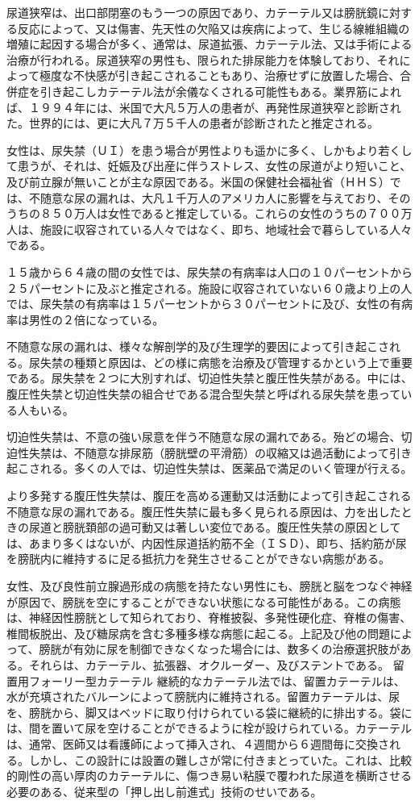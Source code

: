 尿道狭窄は、出口部閉塞のもう一つの原因であり、カテーテル又は膀胱鏡に対する反応によって、又は傷害、先天性の欠陥又は疾病によって、生じる線維組織の増殖に起因する場合が多く、通常は、尿道拡張、カテーテル法、又は手術による治療が行われる。尿道狭窄の男性も、限られた排尿能力を体験しており、それによって極度な不快感が引き起こされることもあり、治療せずに放置した場合、合併症を引き起こしカテーテル法が余儀なくされる可能性もある。業界筋によれば、１９９４年には、米国で大凡５万人の患者が、再発性尿道狭窄と診断された。世界的には、更に大凡７万５千人の患者が診断されたと推定される。

女性は、尿失禁（ＵＩ）を患う場合が男性よりも遥かに多く、しかもより若くして患うが、それは、妊娠及び出産に伴うストレス、女性の尿道がより短いこと、及び前立腺が無いことが主な原因である。米国の保健社会福祉省（ＨＨＳ）では、不随意な尿の漏れは、大凡１千万人のアメリカ人に影響を与えており、そのうちの８５０万人は女性であると推定している。これらの女性のうちの７００万人は、施設に収容されている人々ではなく、即ち、地域社会で暮らしている人々である。

１５歳から６４歳の間の女性では、尿失禁の有病率は人口の１０パーセントから２５パーセントに及ぶと推定される。施設に収容されていない６０歳より上の人では、尿失禁の有病率は１５パーセントから３０パーセントに及び、女性の有病率は男性の２倍になっている。

不随意な尿の漏れは、様々な解剖学的及び生理学的要因によって引き起こされる。尿失禁の種類と原因は、どの様に病態を治療及び管理するかという上で重要である。尿失禁を２つに大別すれば、切迫性失禁と腹圧性失禁がある。中には、腹圧性失禁と切迫性失禁の組合せである混合型失禁と呼ばれる尿失禁を患っている人もいる。

切迫性失禁は、不意の強い尿意を伴う不随意な尿の漏れである。殆どの場合、切迫性失禁は、不随意な排尿筋（膀胱壁の平滑筋）の収縮又は過活動によって引き起こされる。多くの人では、切迫性失禁は、医薬品で満足のいく管理が行える。

より多発する腹圧性失禁は、腹圧を高める運動又は活動によって引き起こされる不随意な尿の漏れである。腹圧性失禁に最も多く見られる原因は、力を出したときの尿道と膀胱頚部の過可動又は著しい変位である。腹圧性失禁の原因としては、あまり多くはないが、内因性尿道括約筋不全（ＩＳＤ）、即ち、括約筋が尿を膀胱内に維持するに足る抵抗力を発生させることができない病態がある。

女性、及び良性前立腺過形成の病態を持たない男性にも、膀胱と脳をつなぐ神経が原因で、膀胱を空にすることができない状態になる可能性がある。この病態は、神経因性膀胱として知られており、脊椎披裂、多発性硬化症、脊椎の傷害、椎間板脱出、及び糖尿病を含む多種多様な病態に起こる。上記及び他の問題によって、膀胱が有効に尿を制御できなくなった場合には、数多くの治療選択肢がある。それらは、カテーテル、拡張器、オクルーダー、及びステントである。 留置用フォーリー型カテーテル 継続的なカテーテル法では、留置カテーテルは、水が充填されたバルーンによって膀胱内に維持される。留置カテーテルは、尿を、膀胱から、脚又はベッドに取り付けられている袋に継続的に排出する。袋には、間を置いて尿を空けることができるように栓が設けられている。カテーテルは、通常、医師又は看護師によって挿入され、４週間から６週間毎に交換される。しかし、この設計には設置の難しさが常に付きまとっていた。これは、比較的剛性の高い厚肉のカテーテルに、傷つき易い粘膜で覆われた尿道を横断させる必要のある、従来型の「押し出し前進式」技術のせいである。

